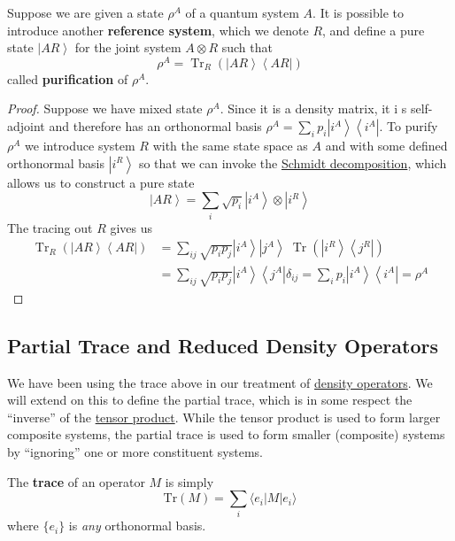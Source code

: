\documentclass{article}
\DeclareMathOperator{\Tr}{Tr}
\newcommand{\ket}[1]{\ensuremath{\left|#1\right\rangle}}
\newcommand{\bra}[1]{\ensuremath{\left\langle#1\right|}}
\newcounter{definition}[section]
\begin{document}
    \begin{definition}[Purifications]
      \label{def:purifications}
      Suppose we are given a state $\rho^A$ of a quantum system $A$. It is possible to introduce another \textbf{reference system}, which we denote $R$, and define a pure state $\ket{AR}$ for the joint system $A \otimes R$ such that 
      \begin{equation}
        \rho^A = \Tr_{R} (\ket{AR}\bra{AR})
      \end{equation}
      called \textbf{purification} of $\rho^A$.
    \end{definition}
    \begin{proof}
      Suppose we have mixed state $\rho^A$. Since it is a density matrix, it i s self-adjoint and therefore has an orthonormal basis $\rho^A = \sum_i p_i \ket{i^A} \bra{i^A}$. To purify $\rho^A$ we introduce system $R$ with the same state space as $A$ and with some defined orthonormal basis $\ket{i^R}$ so that we can invoke the \hyperref[thm:schmidt-decomposition]{Schmidt decomposition}, which allows us to construct a pure state 
      \begin{equation}
        \ket{AR} = \sum_i \sqrt{p_i} \ket{i^A} \otimes \ket{i^R}
      \end{equation}
      The tracing out $R$ gives us 
      \begin{align}
        \Tr_R (\ket{AR} \bra{AR}) & = \sum_{i j} \sqrt{p_i p_j} \ket{i^A} \ket{j^A} \; \Tr(\ket{i^R} \bra{j^R}) \\
                                  & = \sum_{ij} \sqrt{p_i p_j} \ket{i^A} \bra{j^A} \delta_{ij} = \sum_{i} p_i \ket{i^A} \bra{i^A} = \rho^A 
      \end{align}
    \end{proof}

  \subsection{Partial Trace and Reduced Density Operators}

    We have been using the trace above in our treatment of \hyperref[def:density-operator]{density operators}. We will extend on this to define the partial trace, which is in some respect the ``inverse'' of the \hyperref[sm-def:tensor-product]{tensor product}. While the tensor product is used to form larger composite systems, the partial trace is used to form smaller (composite) systems by ``ignoring'' one or more constituent systems. 

    \begin{definition}[Trace]
      \label{def:trace}
      The \textbf{trace} of an operator $M$ is simply 
      \begin{equation}
        \mathrm{Tr}(M) = \sum_i \langle e_i | M | e_i \rangle
      \end{equation}
      where $\{e_i\}$ is \textit{any} orthonormal basis.
    \end{definition}
\end{document}

